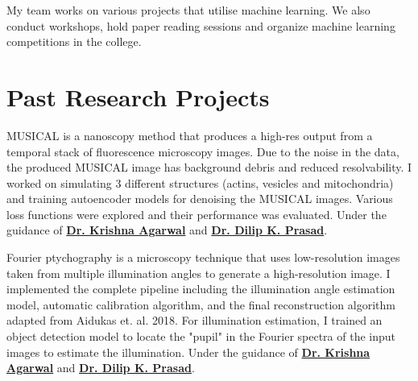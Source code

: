 \documentclass[]{deedy-resume-openfont}
\begin{document}
\begin{minipage}[t]{0.7\textwidth}

\begin{tightemize}
\item My team works on various projects that utilise machine learning. We also conduct workshops, hold paper reading sessions and organize machine learning competitions in the college.
\end{tightemize}
\sectionsep


\section{Past Research Projects}

MUSICAL is a nanoscopy method that produces a high-res output from a temporal stack of fluorescence microscopy images. Due to the noise in the data, the produced MUSICAL image has background debris and reduced resolvability. I worked on simulating 3 different structures (actins, vesicles and mitochondria) and training autoencoder models for denoising the MUSICAL images. Various loss functions were explored and their performance was evaluated. Under the guidance of \href{https://sites.google.com/site/uthkrishth/krishnaagarwal}{\bf Dr. Krishna Agarwal} and \href{https://sites.google.com/site/dilipprasad/}{\bf Dr. Dilip K. Prasad}.
\sectionsep

Fourier ptychography is a microscopy technique that uses low-resolution images taken from multiple illumination angles to generate a high-resolution image. I implemented the complete pipeline including the illumination angle estimation model, automatic calibration algorithm, and the final reconstruction algorithm adapted from Aidukas et. al. 2018. For illumination estimation, I trained an object detection model to locate the "pupil" in the Fourier spectra of the input images to estimate the illumination. Under the guidance of \href{https://sites.google.com/site/uthkrishth/krishnaagarwal}{\bf Dr. Krishna Agarwal} and \href{https://sites.google.com/site/dilipprasad/}{\bf Dr. Dilip K. Prasad}.
\sectionsep


\end{minipage}
\end{document}
